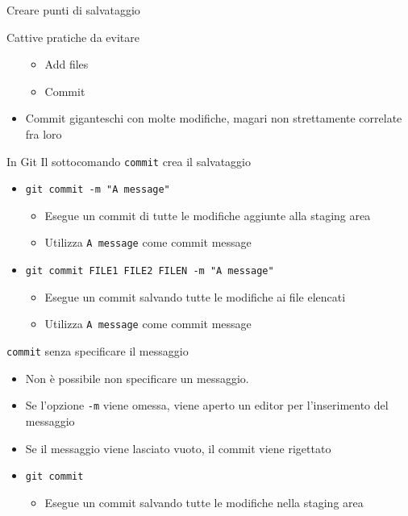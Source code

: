\documentclass[xcolor=dvipsnames,presentation]{beamer}
\begin{document}
\begin{frame}{Creare punti di salvataggio}
\begin{block}{Cattive pratiche da evitare}
\begin{itemize}
\begin{itemize}
                \item Add files
                \item Commit
            \end{itemize}
            \item Commit giganteschi con molte modifiche, magari non strettamente correlate fra loro
        \end{itemize}
    \end{block}
    \begin{block}{In Git}
        Il sottocomando \texttt{commit} crea il salvataggio
        \begin{itemize}
            \item \texttt{git commit -m "A message"}
            \begin{itemize}
                \footnotesize
                \item Esegue un commit di tutte le modifiche aggiunte alla staging area
                \item Utilizza \texttt{A message} come commit message
            \end{itemize}
            \item \texttt{git commit FILE1 FILE2 FILEN -m "A message"}
            \begin{itemize}
                \footnotesize
                \item Esegue un commit salvando tutte le modifiche ai file elencati
                \item Utilizza \texttt{A message} come commit message
            \end{itemize}
        \end{itemize}
    \end{block}
    \begin{block}{\texttt{commit} senza specificare il messaggio}
        \begin{itemize}
            \item Non è possibile non specificare un messaggio.
            \item Se l'opzione \texttt{-m} viene omessa, viene aperto un editor per l'inserimento
del messaggio
            \item Se il messaggio viene lasciato vuoto, il commit viene rigettato
            \item \texttt{git commit}
            \begin{itemize}
                \footnotesize
                \item Esegue un commit salvando tutte le modifiche nella staging area

\end{itemize}
\end{itemize}
\end{block}
\end{frame}
\end{document}
